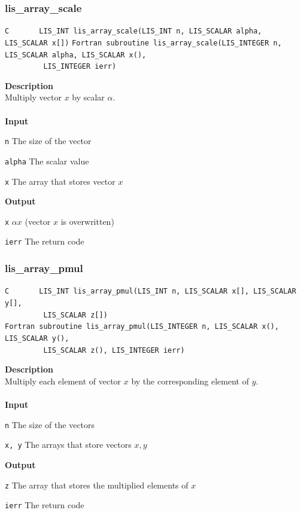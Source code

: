 \documentclass[a4paper]{article}
\newcommand{\namelistlabel}[1]{\mbox{#1}\hfill}
\newenvironment{namelist}[1]{%
\begin{list}{}
  {\let\makelabel\namelistlabel
  \settowidth{\labelwidth}{#1}
  \setlength{\leftmargin}{1.1\labelwidth}}
  }{%
\end{list}}
\begin{document}
\subsubsection{lis\_array\_scale}
\begin{screen}
\verb|C       LIS_INT lis_array_scale(LIS_INT n, LIS_SCALAR alpha, LIS_SCALAR x[])|
\verb|Fortran subroutine lis_array_scale(LIS_INTEGER n, LIS_SCALAR alpha, LIS_SCALAR x(),|\\
\verb|         LIS_INTEGER ierr)|
\end{screen}
{\bf Description}\\
\indent
Multiply vector $x$ by scalar $\alpha$.
\\ \\
\noindent
{\bf Input}
\begin{namelist}{XXXXXXXXXXXXXXXXXXXX}
\item[\tt n] The size of the vector  
\item[\tt alpha] The scalar value
\item[\tt x] The array that stores vector $x$
\end{namelist}
{\bf Output}
\begin{namelist}{XXXXXXXXXXXXXXXXXXXX}
\item[\tt x] $\alpha x$ (vector $x$ is overwritten)
\item[\tt ierr] The return code
\end{namelist}

\newpage
\subsubsection{lis\_array\_pmul}
\begin{screen}
\verb|C       LIS_INT lis_array_pmul(LIS_INT n, LIS_SCALAR x[], LIS_SCALAR y[],|\\
\verb|         LIS_SCALAR z[])|\\
\verb|Fortran subroutine lis_array_pmul(LIS_INTEGER n, LIS_SCALAR x(), LIS_SCALAR y(),|\\
\verb|         LIS_SCALAR z(), LIS_INTEGER ierr)|
\end{screen}
{\bf Description}\\
\indent
Multiply each element of vector $x$ by the corresponding element of $y$.
\\ \\
\noindent
{\bf Input}
\begin{namelist}{XXXXXXXXXXXXXXXXXXXX}
\item[\tt n] The size of the vectors  
\item[\tt x, y] The arrays that store vectors $x, y$
\end{namelist}
{\bf Output}
\begin{namelist}{XXXXXXXXXXXXXXXXXXXX}
\item[\tt z] The array that stores the multiplied elements of $x$
\item[\tt ierr] The return code
\end{namelist}
\end{document}
